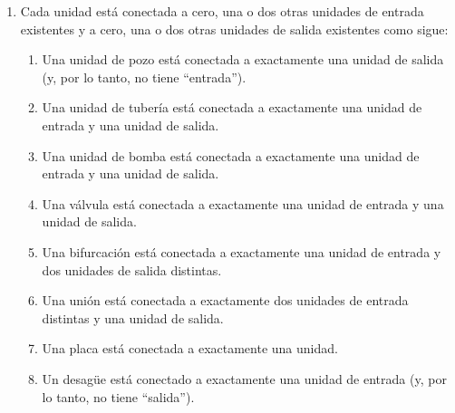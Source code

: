 \HHHH\LLLL

\begin{enumerate}\setei
\item \label{p-e-11}   Cada unidad está conectada a cero, una o dos
                       otras unidades de entrada existentes y a cero, una o dos
                       otras unidades de salida existentes como sigue:
\begin{enumerate}
\item \label{p-e-04}   Una unidad de pozo está conectada a exactamente una unidad de salida
                       (y, por lo tanto, no tiene ``entrada'').
\item \label{p-e-05}   Una unidad de tubería está conectada a exactamente una unidad de entrada
                       y una unidad de salida.
\item \label{p-e-06}   Una unidad de bomba está conectada a exactamente una unidad de entrada
                       y una unidad de salida.
\item \label{p-e-07}   Una válvula está conectada a exactamente una unidad de entrada
                       y una unidad de salida.
\item \label{p-e-08}   Una bifurcación está conectada a exactamente una unidad de entrada
                       y dos unidades de salida distintas.
\item \label{p-e-09}   Una unión está conectada a exactamente dos unidades de entrada distintas
                       y una unidad de salida.
\item \label{p-e-85}   Una placa está conectada a exactamente una unidad.
\item \label{p-e-10}   Un desagüe está conectado a exactamente una unidad de entrada
                       (y, por lo tanto, no tiene ``salida''). 
\end{enumerate}
\savei\end{enumerate}

\mnewfoil\LLLL

